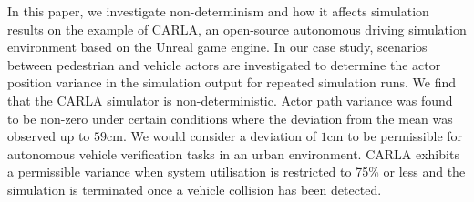 \documentclass[runningheads,twocolumn,a4paper,10pt]{llncs}
\begin{document}
In this paper, we investigate non-determinism and how it affects simulation results on the example of CARLA, an open-source autonomous driving simulation environment based on the Unreal game engine.
%
In our case study, scenarios between pedestrian and vehicle actors are investigated to determine the actor position variance in the simulation output for repeated simulation runs. 
%
%
We find that the CARLA simulator is non-deterministic. Actor path variance was found to be non-zero under certain conditions where the deviation from the mean was observed up to $59$cm. We would consider a deviation of $1$cm to be permissible for autonomous vehicle verification tasks in an urban environment. 
%
CARLA exhibits a permissible variance when system utilisation is restricted to 75\% or less and the simulation is terminated once a vehicle collision has been detected. 
%
\end{document}
